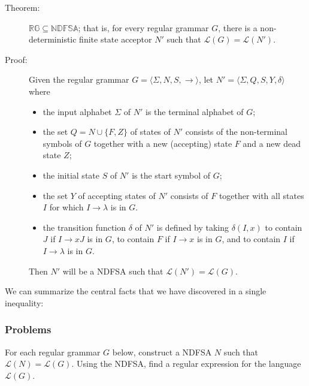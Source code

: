 \documentclass{article}
\newcommand{\El}{\mathcal L}
\begin{document}
\begin{description}

\item[Theorem:] $\mathbb{RG} \subseteq \mathbb{NDFSA}$; that is, for every regular grammar $G$, there is a non-deterministic finite state acceptor $N'$ such that $\El(G) = \El(N')$.

\item[Proof:] Given the regular grammar $G = \langle \Sigma, N, S, \to \rangle$, let $N' = \langle \Sigma, Q, S, Y, \delta \rangle$ where

  \begin{itemize}
    \item the input alphabet $\Sigma$ of $N'$ is the terminal alphabet of $G$; 
    \item the set $Q = N \cup \{F,Z\}$ of states of $N'$ consists of the non-terminal symbols of $G$ together with a new (accepting) state $F$ and a new dead state $Z$; 
    \item the initial state $S$ of $N'$ is the start symbol of $G$; 
    \item the set $Y$ of accepting states of $N'$ consists of $F$ together with all states $I$ for which $I \to \lambda$ is in $G$.
    \item the transition function $\delta$ of $N'$ is defined by taking $\delta(I,x)$ to contain $J$ if $I \to xJ$ is in $G$, to contain $F$ if $I \to x$ is in $G$, and to contain $I$ if $I \to \lambda$ is in $G$.
  \end{itemize}

  Then $N'$ will be a NDFSA such that $\El(N') = \El(G)$.

\end{description}

We can summarize the central facts that we have discovered in a single inequality:

\begin{center}
\end{center}


\subsubsection*{Problems}

For each regular grammar $G$ below, construct a NDFSA $N$ such that $\El(N) = \El(G)$. Using the NDFSA, find a regular expression for the language $\El(G)$.
\end{document}
